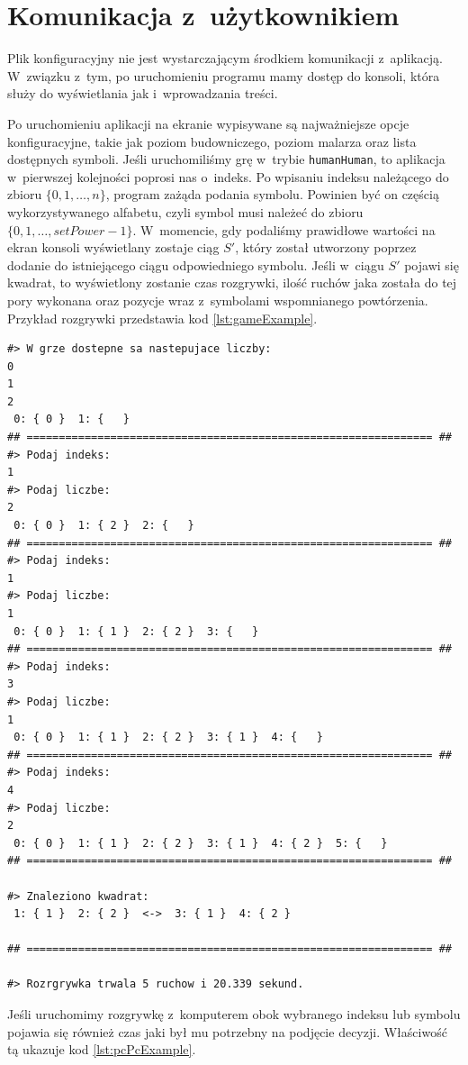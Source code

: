 \documentclass[document]{xmgr}
\begin{document}
\section{Komunikacja z~użytkownikiem}
Plik konfiguracyjny nie jest wystarczającym środkiem komunikacji z~ap\-likacją. W~związku z~tym, po uruchomieniu programu mamy dostęp do konsoli, która służy do wyświetlania jak i~wprowadzania treści.

Po uruchomieniu aplikacji na ekranie wypisywane są najważniejsze op\-cje konfiguracyjne, takie jak poziom budowniczego, poziom malarza oraz lista dostępnych symboli. Jeśli uruchomiliśmy grę w~trybie \texttt{humanHuman}, to aplikacja w~pierwszej kolejności poprosi nas o~indeks. Po wpisaniu indeksu należącego do zbioru \mbox{$\{0, 1, \ldots,n\}$}, program zażąda podania symbolu. Powinien być on częścią wykorzystywanego alfabetu, czyli symbol musi należeć do zbioru \mbox{$\{0, 1, \ldots, setPower-1\}$}. W~momencie, gdy podaliśmy prawidłowe wartości na ekran konsoli wyświetlany zostaje ciąg $S'$, który został utworzony poprzez dodanie do istniejącego ciągu odpowiedniego symbolu. Jeśli w~ciągu $S'$ pojawi się kwadrat, to wyświetlony zostanie czas rozgrywki, ilość ruchów jaka została do tej pory wykonana oraz pozycje wraz z~symbolami wspomnianego powtórzenia. Przykład rozgrywki przedstawia kod \ref{lst:gameExample}.


\newpage
\begin{lstlisting}[caption={Rozgrywka dwóch graczy wypisana w konsoli.},label=lst:gameExample]
#> W grze dostepne sa nastepujace liczby: 
0
1
2
 0: { 0 }  1: {   } 
## =============================================================== ##
#> Podaj indeks: 
1
#> Podaj liczbe: 
2
 0: { 0 }  1: { 2 }  2: {   } 
## =============================================================== ##
#> Podaj indeks: 
1
#> Podaj liczbe: 
1
 0: { 0 }  1: { 1 }  2: { 2 }  3: {   } 
## =============================================================== ##
#> Podaj indeks: 
3
#> Podaj liczbe: 
1
 0: { 0 }  1: { 1 }  2: { 2 }  3: { 1 }  4: {   } 
## =============================================================== ##
#> Podaj indeks: 
4
#> Podaj liczbe: 
2
 0: { 0 }  1: { 1 }  2: { 2 }  3: { 1 }  4: { 2 }  5: {   } 
## =============================================================== ##

#> Znaleziono kwadrat:  
 1: { 1 }  2: { 2 }  <->  3: { 1 }  4: { 2 } 

## =============================================================== ##

#> Rozrgrywka trwala 5 ruchow i 20.339 sekund.
\end{lstlisting}
Jeśli uruchomimy rozgrywkę z~komputerem obok wybranego indeksu lub symbolu pojawia się również czas jaki był mu potrzebny na podjęcie decyzji. Właściwość tą ukazuje kod \ref{lst:pcPcExample}.
\end{document}
